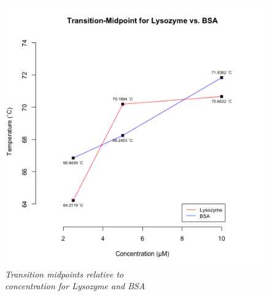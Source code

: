 \documentclass[a4paper,10pt]{article}
\begin{document}
            \begin{minipage}{0.49\textwidth}
                \begin{figure}[H]
                    \centering
                    \includegraphics[width=\textwidth]{../resources/unfolding_tempVconc.png}
                    \caption{\it Transition midpoints relative to\\concentration for Lysozyme and BSA}
                    \label{fig:temp_v_mid}
                \end{figure}
            \end{minipage}
\end{document}
